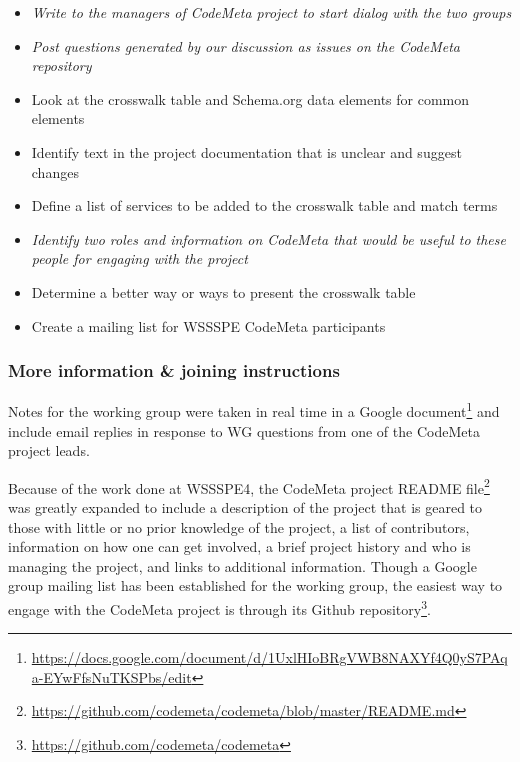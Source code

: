 \begin{itemize}
\item {\em Write to the managers of CodeMeta project to start dialog with the two groups} 
\item {\em Post questions generated by our discussion as issues on the CodeMeta repository}
\item Look at the crosswalk table and Schema.org data elements for common elements
\item Identify text in the project documentation that is unclear and suggest changes
\item Define a list of services to be added to the crosswalk table and match terms
\item {\em Identify two roles and information on CodeMeta that would be useful to these people for engaging with the project}
\item Determine a better way or ways to present the crosswalk table
\item Create a mailing list for WSSSPE CodeMeta participants
\end{itemize}


\subsubsection{More information \& joining instructions}

Notes for the working group were taken in real time in a Google document\footnote{\url{https://docs.google.com/document/d/1UxlHIoBRgVWB8NAXYf4Q0yS7PAqa-EYwFfsNuTKSPbs/edit}} and include email replies in response to WG questions from one of the CodeMeta project leads.

Because of the work done at WSSSPE4, the CodeMeta project README file\footnote{\url{https://github.com/codemeta/codemeta/blob/master/README.md}} was greatly expanded to include a description of the project that is geared to those with little or no prior knowledge of the project, a list of contributors, information on how one can get involved, a brief project history and who is managing the project, and links to additional information. Though a Google group mailing list has been established for the working group, the easiest way to engage with the CodeMeta project is through its Github repository\footnote{\url{https://github.com/codemeta/codemeta}}. 

